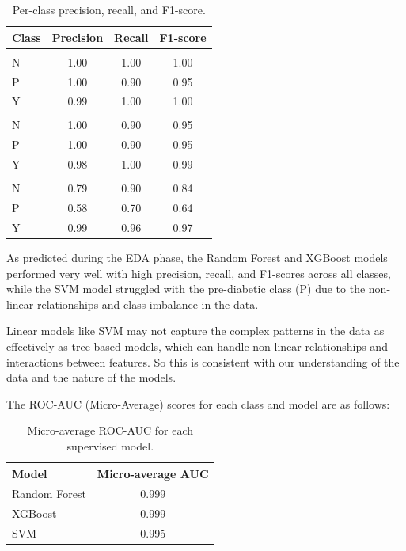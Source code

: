 ﻿\documentclass{article}
\begin{document}
\begin{table}[H]
\centering
\scriptsize
\caption{Per-class precision, recall, and F1-score.}
\label{tab:classification_report}
\begin{tabularx}{\columnwidth}{>{\raggedright\arraybackslash}Xccc}
\toprule
Class & Precision & Recall & F1-score \\
\midrule
\multicolumn{4}{l}{\textbf{Random Forest}} \\
N & 1.00 & 1.00 & 1.00 \\
P & 1.00 & 0.90 & 0.95 \\
Y & 0.99 & 1.00 & 1.00 \\
\addlinespace
\multicolumn{4}{l}{\textbf{XGBoost}} \\
N & 1.00 & 0.90 & 0.95 \\
P & 1.00 & 0.90 & 0.95 \\
Y & 0.98 & 1.00 & 0.99 \\
\addlinespace
\multicolumn{4}{l}{\textbf{SVM}} \\
N & 0.79 & 0.90 & 0.84 \\
P & 0.58 & 0.70 & 0.64 \\
Y & 0.99 & 0.96 & 0.97 \\
\bottomrule
\end{tabularx}
\end{table}


As predicted during the EDA phase, the Random Forest and XGBoost models performed very well with high precision, recall, and F1-scores across all classes, while the SVM model struggled with the pre-diabetic class (P) due to the non-linear relationships and class imbalance in the data.

Linear models like SVM may not capture the complex patterns in the data as effectively as tree-based models, which can handle non-linear relationships and interactions between features.
So this is consistent with our understanding of the data and the nature of the models.

The ROC-AUC (Micro-Average) scores for each class and model are as follows:

\begin{table}[H]
\centering
\scriptsize
\caption{Micro-average ROC-AUC for each supervised model.}
\label{tab:auc_micro}
\begin{tabularx}{\columnwidth}{>{\raggedright\arraybackslash}Xc}
\toprule
Model & Micro-average AUC \\
\midrule
Random Forest & 0.999 \\
XGBoost & 0.999 \\
SVM & 0.995 \\
\bottomrule
\end{tabularx}
\end{table}
\end{document}
